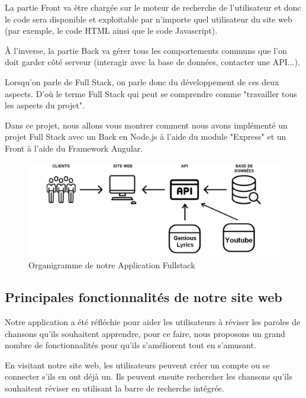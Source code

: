\documentclass[12pt,french]{article}
\begin{document}
\medskip

La partie \gls{Front} va être chargée sur le moteur de recherche de l'utilisateur et donc le code sera disponible et exploitable par n'importe quel utilisateur du site web (par exemple, le code \gls{HTML} ainsi que le code \gls{Javascript}).

\medskip

À l'inverse, la partie \gls{Back} va gérer tous les comportements communs que l'on doit garder côté serveur (interagir avec la base de données, contacter une \gls{API}...).

\medskip

Lorsqu'on parle de Full Stack, on parle donc du développement de ces deux aspects. D'où le terme Full Stack qui peut se comprendre comme "travailler tous les aspects du projet".

\medskip

Dans ce projet, nous allons vous montrer comment nous avons implémenté un projet Full Stack avec un \gls{Back} en Node.js à l'aide du module "Express" et un \gls{Front} à l'aide du \gls{Framework} Angular.

\begin{figure}[H]
	\centering
	\includegraphics[scale=0.4]{fullstack.png}
	\caption{Organigramme de notre Application Fullstack}    
\end{figure}

\subsection{Principales fonctionnalités de notre site web}

Notre application a été réfléchie pour aider les utilisateurs à réviser les paroles de chansons qu'ils souhaitent apprendre, pour ce faire, nous proposons un grand nombre de fonctionnalités pour qu'ils s'améliorent tout en s'amusant.
\newline 

En visitant notre site web, les utilisateurs peuvent créer un compte ou se connecter s'ils en ont déjà un. Ils peuvent ensuite rechercher les chansons qu'ils souhaitent réviser en utilisant la barre de recherche intégrée.
\newline 
\end{document}
